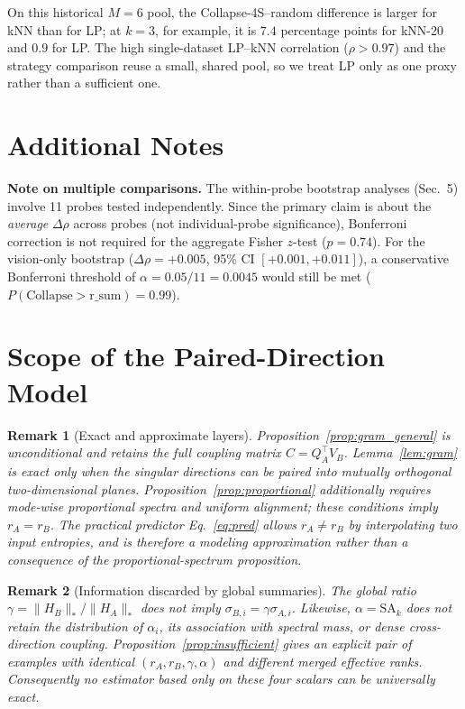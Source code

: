 \documentclass{article}
\newcommand{\SAk}{\ensuremath{\mathrm{SA}_k}\xspace}
\newtheorem{remark}{Remark}
\begin{document}
On this historical $M{=}6$ pool, the Collapse-4S--random difference is
larger for kNN than for LP; at $k{=}3$, for example, it is $7.4$ percentage
points for kNN-20 and $0.9$ for LP.  The high single-dataset LP--kNN
correlation ($\rho{>}0.97$) and the strategy comparison reuse a small,
shared pool, so we treat LP only as one proxy rather than a sufficient one.

\section{Additional Notes}
\label{app:method_comparison}

\textbf{Note on multiple comparisons.}
The within-probe bootstrap analyses (Sec.~5) involve 11 probes
tested independently.
Since the primary claim is about the \emph{average} $\Delta\rho$ across probes
(not individual-probe significance), Bonferroni correction is not required
for the aggregate Fisher $z$-test ($p{=}0.74$).
For the vision-only bootstrap ($\Delta\rho{=}+0.005$, 95\% CI $[+0.001,+0.011]$),
a conservative Bonferroni threshold of $\alpha{=}0.05/11{=}0.0045$ would still
be met ($P(\text{Collapse}>\text{r\_sum}){=}0.99$).


\section{Scope of the Paired-Direction Model}
\label{app:pa_scope}
\label{app:generalization}
\label{app:calibration}
\label{app:algorithm}

\begin{remark}[Exact and approximate layers]
Proposition~\ref{prop:gram_general} is unconditional and retains the full
coupling matrix $C=Q_A^\top V_B$.  Lemma~\ref{lem:gram} is exact only when
the singular directions can be paired into mutually orthogonal
two-dimensional planes.  Proposition~\ref{prop:proportional} additionally
requires mode-wise proportional spectra and uniform alignment; these
conditions imply $r_A=r_B$.  The practical predictor
Eq.~\eqref{eq:pred} allows $r_A\neq r_B$ by interpolating two input
entropies, and is therefore a modeling approximation rather than a
consequence of the proportional-spectrum proposition.
\end{remark}

\begin{remark}[Information discarded by global summaries]
The global ratio $\gamma=\|H_B\|_*/\|H_A\|_*$ does not imply
$\sigma_{B,i}=\gamma\sigma_{A,i}$.  Likewise,
$\alpha=\SAk$ does not retain the distribution of $\alpha_i$, its
association with spectral mass, or dense cross-direction coupling.
Proposition~\ref{prop:insufficient} gives an explicit pair of examples
with identical $(r_A,r_B,\gamma,\alpha)$ and different merged effective
ranks.  Consequently no estimator based only on these four scalars can be
universally exact.
\end{remark}
\end{document}
